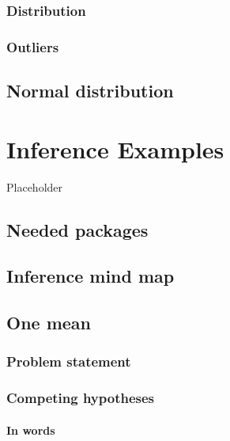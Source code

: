 \documentclass[12pt, krantz2,]{krantz}
\begin{document}
\hypertarget{distribution}{%
\subsection{Distribution}\label{distribution}}

\hypertarget{outliers}{%
\subsection{Outliers}\label{outliers}}

\hypertarget{normal-curve}{%
\section{Normal distribution}\label{normal-curve}}

\hypertarget{appendixB}{%
\chapter{Inference Examples}\label{appendixB}}

Placeholder

\hypertarget{needed-packages-10}{%
\section*{Needed packages}\label{needed-packages-10}}


\hypertarget{inference-mind-map}{%
\section{Inference mind map}\label{inference-mind-map}}

\hypertarget{one-mean}{%
\section{One mean}\label{one-mean}}

\hypertarget{problem-statement}{%
\subsection{Problem statement}\label{problem-statement}}

\hypertarget{competing-hypotheses}{%
\subsection{Competing hypotheses}\label{competing-hypotheses}}

\hypertarget{in-words}{%
\subsubsection*{In words}\label{in-words}}
\end{document}
